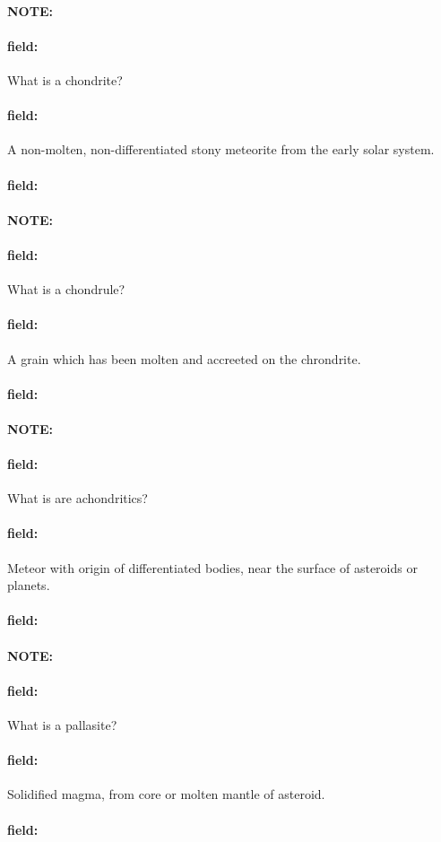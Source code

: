 \documentclass[12pt]{article}
\newenvironment{note}{\paragraph{NOTE:}}{}
\newenvironment{field}{\paragraph{field:}}{}
\begin{document}
\begin{note}
   \begin{field}
       What is a chondrite?
   \end{field}
   \begin{field}
		A non-molten, non-differentiated stony meteorite from the early solar system.
   \end{field}
   \begin{field}
   \end{field}
\end{note}
\begin{note}
   \begin{field}
       What is a chondrule?
   \end{field}
   \begin{field}
		A grain which has been molten and accreeted on the chrondrite.
   \end{field}
   \begin{field}
   \end{field}
\end{note}
\begin{note}
   \begin{field}
       What is are achondritics?
   \end{field}
   \begin{field}
		Meteor with origin of differentiated bodies, near the surface of asteroids or planets.
   \end{field}
   \begin{field}
   \end{field}
\end{note}
\begin{note}
   \begin{field}
       What is a pallasite?
   \end{field}
   \begin{field}
		Solidified magma, from core or molten mantle of asteroid.
   \end{field}
   \begin{field}
   \end{field}
\end{note}
\end{document}
